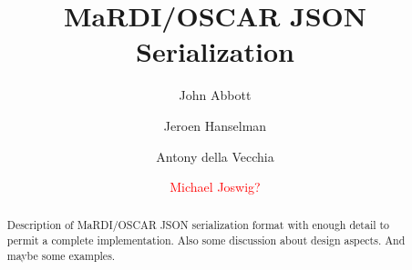 \documentclass{article}
\def\red#1{\textcolor{red}{#1}}
\begin{document}
\renewcommand*{\today}{2024-05-23} %


\title{MaRDI/OSCAR JSON Serialization}

\author{
  John Abbott%
  \and
  Jeroen Hanselman%
  \and
  Antony della Vecchia%
\and \red{Michael Joswig?}
}
%
%
%
\maketitle              %


\begin{abstract}
  Description of MaRDI/OSCAR JSON serialization format with enough detail
  to permit a complete implementation.
  Also some discussion about design aspects.  And maybe some examples.
\end{abstract}






\end{document}
